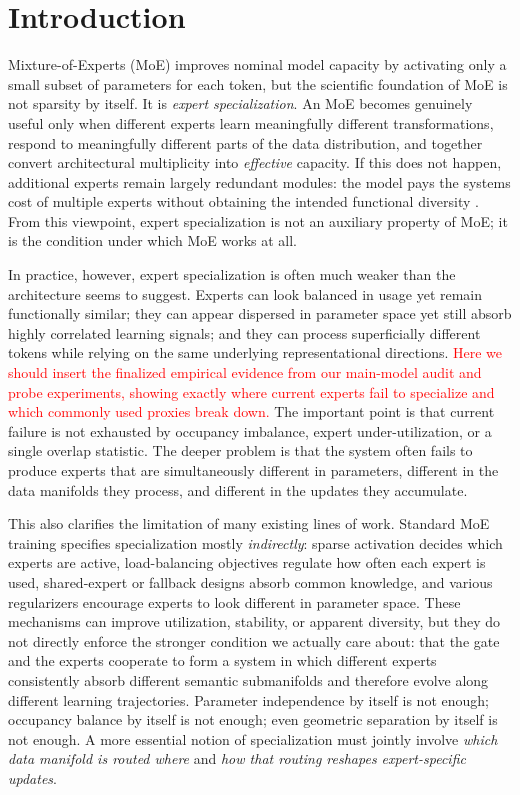 \section{Introduction}
\label{sec:intro}

Mixture-of-Experts (MoE) improves nominal model capacity by activating only a small subset of parameters for each token, but the scientific foundation of MoE is not sparsity by itself. It is \emph{expert specialization}. An MoE becomes genuinely useful only when different experts learn meaningfully different transformations, respond to meaningfully different parts of the data distribution, and together convert architectural multiplicity into \emph{effective} capacity. If this does not happen, additional experts remain largely redundant modules: the model pays the systems cost of multiple experts without obtaining the intended functional diversity \citep{fedus2022switch}. From this viewpoint, expert specialization is not an auxiliary property of MoE; it is the condition under which MoE works at all.

In practice, however, expert specialization is often much weaker than the architecture seems to suggest. Experts can look balanced in usage yet remain functionally similar; they can appear dispersed in parameter space yet still absorb highly correlated learning signals; and they can process superficially different tokens while relying on the same underlying representational directions. \textcolor{red}{Here we should insert the finalized empirical evidence from our main-model audit and probe experiments, showing exactly where current experts fail to specialize and which commonly used proxies break down.} The important point is that current failure is not exhausted by occupancy imbalance, expert under-utilization, or a single overlap statistic. The deeper problem is that the system often fails to produce experts that are simultaneously different in parameters, different in the data manifolds they process, and different in the updates they accumulate.

This also clarifies the limitation of many existing lines of work. Standard MoE training specifies specialization mostly \emph{indirectly}: sparse activation decides which experts are active, load-balancing objectives regulate how often each expert is used, shared-expert or fallback designs absorb common knowledge, and various regularizers encourage experts to look different in parameter space. These mechanisms can improve utilization, stability, or apparent diversity, but they do not directly enforce the stronger condition we actually care about: that the gate and the experts cooperate to form a system in which different experts consistently absorb different semantic submanifolds and therefore evolve along different learning trajectories. Parameter independence by itself is not enough; occupancy balance by itself is not enough; even geometric separation by itself is not enough. A more essential notion of specialization must jointly involve \emph{which data manifold is routed where} and \emph{how that routing reshapes expert-specific updates}.

